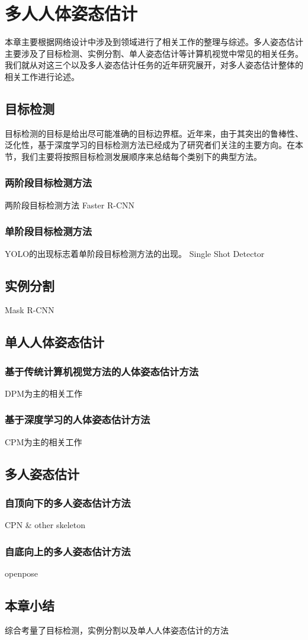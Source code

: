 \chapter{多人人体姿态估计}
\label{cha:related}
本章主要根据网络设计中涉及到领域进行了相关工作的整理与综述。多人姿态估计主要涉及了目标检测、实例分割、单人姿态估计等计算机视觉中常见的相关任务。我们就从对这三个以及多人姿态估计任务的近年研究展开，对多人姿态估计整体的相关工作进行论述。
\section{目标检测}
\label{sec:detect}
目标检测的目标是给出尽可能准确的目标边界框。近年来，由于其突出的鲁棒性、泛化性，基于深度学习的目标检测方法已经成为了研究者们关注的主要方向。在本节，我们主要将按照目标检测发展顺序来总结每个类别下的典型方法。
\subsection{两阶段目标检测方法}
\label{2stagedetector}
两阶段目标检测方法
Faster R-CNN
\subsection{单阶段目标检测方法}
\label{subsec:1stagedetector}
YOLO\cite{redmon2016you}的出现标志着单阶段目标检测方法的出现。
Single Shot Detector

\section{实例分割}
\label{sec:insseg}
Mask R-CNN

\section{单人人体姿态估计}
\label{sec:singlepose}
\subsection{基于传统计算机视觉方法的人体姿态估计方法}
\label{subsec:legacypose}
DPM为主的相关工作
\subsection{基于深度学习的人体姿态估计方法}
\label{subsec:deeppose}
CPM为主的相关工作

\section{多人姿态估计}
\label{sec:multipose}
\subsection{自顶向下的多人姿态估计方法}
\label{subsec:topdownpose}
CPN \& other skeleton
\subsection{自底向上的多人姿态估计方法}
\label{subsec:bottomuppose}
openpose

\section{本章小结}
综合考量了目标检测，实例分割以及单人人体姿态估计的方法

